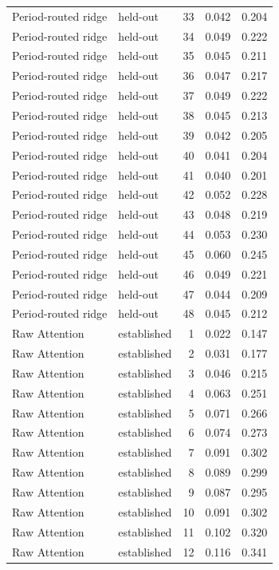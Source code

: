 \begin{tabular}{llrrr}
Period-routed ridge & held-out & 33 & 0.042 & 0.204 \\
Period-routed ridge & held-out & 34 & 0.049 & 0.222 \\
Period-routed ridge & held-out & 35 & 0.045 & 0.211 \\
Period-routed ridge & held-out & 36 & 0.047 & 0.217 \\
Period-routed ridge & held-out & 37 & 0.049 & 0.222 \\
Period-routed ridge & held-out & 38 & 0.045 & 0.213 \\
Period-routed ridge & held-out & 39 & 0.042 & 0.205 \\
Period-routed ridge & held-out & 40 & 0.041 & 0.204 \\
Period-routed ridge & held-out & 41 & 0.040 & 0.201 \\
Period-routed ridge & held-out & 42 & 0.052 & 0.228 \\
Period-routed ridge & held-out & 43 & 0.048 & 0.219 \\
Period-routed ridge & held-out & 44 & 0.053 & 0.230 \\
Period-routed ridge & held-out & 45 & 0.060 & 0.245 \\
Period-routed ridge & held-out & 46 & 0.049 & 0.221 \\
Period-routed ridge & held-out & 47 & 0.044 & 0.209 \\
Period-routed ridge & held-out & 48 & 0.045 & 0.212 \\
Raw Attention & established & 1 & 0.022 & 0.147 \\
Raw Attention & established & 2 & 0.031 & 0.177 \\
Raw Attention & established & 3 & 0.046 & 0.215 \\
Raw Attention & established & 4 & 0.063 & 0.251 \\
Raw Attention & established & 5 & 0.071 & 0.266 \\
Raw Attention & established & 6 & 0.074 & 0.273 \\
Raw Attention & established & 7 & 0.091 & 0.302 \\
Raw Attention & established & 8 & 0.089 & 0.299 \\
Raw Attention & established & 9 & 0.087 & 0.295 \\
Raw Attention & established & 10 & 0.091 & 0.302 \\
Raw Attention & established & 11 & 0.102 & 0.320 \\
Raw Attention & established & 12 & 0.116 & 0.341 \\

\end{tabular}
